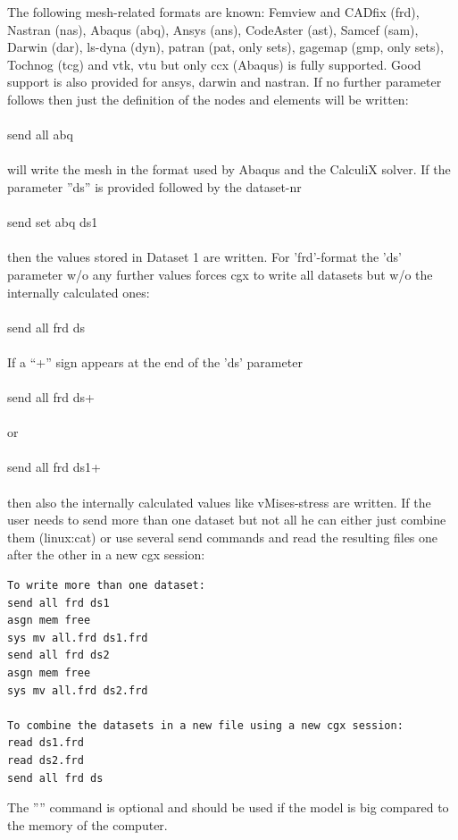 \documentclass{article}
\begin{document}
The following mesh-related formats are known: Femview and CADfix (frd), Nastran (nas), Abaqus (abq), Ansys (ans), CodeAster (ast), Samcef (sam), Darwin (dar), ls-dyna (dyn), patran (pat, only sets), gagemap (gmp, only sets), Tochnog (tcg) and vtk, vtu but only ccx (Abaqus) is fully supported. Good support is also provided for ansys, darwin and nastran. If no further parameter follows then just the definition of the nodes and elements will be written:\\\\send all abq\\\\will write the mesh in the format used by Abaqus and the CalculiX solver. If the parameter ''ds'' is provided followed by the dataset-nr\\\\send set abq ds1\\\\then the values stored in Dataset 1 are written. For 'frd'-format the 'ds' parameter w/o any further values forces cgx to write all datasets but w/o the internally calculated ones:\\\\send all frd ds\\\\If a ``+'' sign appears at the end of the 'ds' parameter\\\\send all frd ds+\\\\or \\\\send all frd ds1+\\\\then also the internally calculated values like vMises-stress are written. If the user needs to send more than one dataset but not all he can either just combine them (linux:cat) or use several send commands and read the resulting files one after the other in a new cgx session:
\begin{verbatim}
To write more than one dataset:
send all frd ds1
asgn mem free
sys mv all.frd ds1.frd
send all frd ds2
asgn mem free
sys mv all.frd ds2.frd

To combine the datasets in a new file using a new cgx session:
read ds1.frd
read ds2.frd
send all frd ds
\end{verbatim}
The '''' command is optional and should be used if the model is big compared to the memory of the computer.
\end{document}
